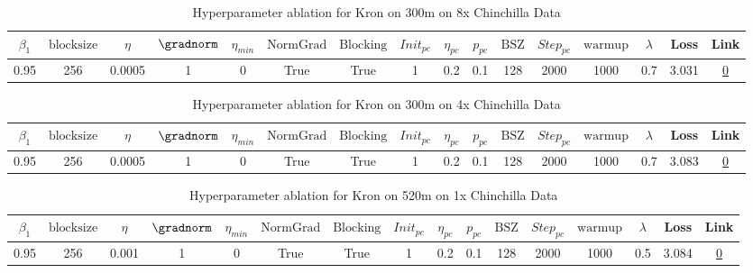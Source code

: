 \begin{table}[H]
\centering
\caption{Hyperparameter ablation for Kron on 300m on 8x Chinchilla Data}
\label{tab:ablation_kron_300m_8}
\begin{tabular}{cccccccccccccccc}
\toprule
$\beta_1$ & $\mathrm{block size}$ & $\eta$ & $\gradnorm$ & $\eta_{min}$ & $\mathrm{NormGrad}$ & $\mathrm{Blocking}$ & $Init_{pc}$ & $\eta_{pc}$ & $p_{pc}$ & $\mathrm{BSZ}$ & $Step_{pc}$ & $\mathrm{warmup}$ & $\lambda$ & Loss & Link \\
\midrule
0.95 & 256 & 0.0005 & 1 & 0 & True & True & 1 & 0.2 & 0.1 & 128 & 2000 & 1000 & 0.7 & 3.031 & \href{https://wandb.ai/stanford-mercury/optimizer-scaling/runs/sweep-300m-48B-kronabb76feelr0.0005-wd0.7-b10.95-plr0.2-pis1-gn1-0ed5c4}{0} \\
\midrule
\bottomrule
\end{tabular}
\end{table}

\begin{table}[H]
\centering
\caption{Hyperparameter ablation for Kron on 300m on 4x Chinchilla Data}
\label{tab:ablation_kron_300m_4}
\begin{tabular}{cccccccccccccccc}
\toprule
$\beta_1$ & $\mathrm{block size}$ & $\eta$ & $\gradnorm$ & $\eta_{min}$ & $\mathrm{NormGrad}$ & $\mathrm{Blocking}$ & $Init_{pc}$ & $\eta_{pc}$ & $p_{pc}$ & $\mathrm{BSZ}$ & $Step_{pc}$ & $\mathrm{warmup}$ & $\lambda$ & Loss & Link \\
\midrule
0.95 & 256 & 0.0005 & 1 & 0 & True & True & 1 & 0.2 & 0.1 & 128 & 2000 & 1000 & 0.7 & 3.083 & \href{https://wandb.ai/stanford-mercury/optimizer-scaling/runs/sweep-300m-24B-kronb55572lr0.0005-wd0.7-b10.95-plr0.2-pis1-gn1-n-9479df}{0} \\
\midrule
\bottomrule
\end{tabular}
\end{table}

\begin{table}[H]
\centering
\caption{Hyperparameter ablation for Kron on 520m on 1x Chinchilla Data}
\label{tab:ablation_kron_520m_1}
\begin{tabular}{cccccccccccccccc}
\toprule
$\beta_1$ & $\mathrm{block size}$ & $\eta$ & $\gradnorm$ & $\eta_{min}$ & $\mathrm{NormGrad}$ & $\mathrm{Blocking}$ & $Init_{pc}$ & $\eta_{pc}$ & $p_{pc}$ & $\mathrm{BSZ}$ & $Step_{pc}$ & $\mathrm{warmup}$ & $\lambda$ & Loss & Link \\
\midrule
0.95 & 256 & 0.001 & 1 & 0 & True & True & 1 & 0.2 & 0.1 & 128 & 2000 & 1000 & 0.5 & 3.084 & \href{https://wandb.ai/stanford-mercury/optimizer-scaling/runs/sweep-520m-10B-kronb99966lr0.001-wd0.5-b10.95-plr0.2-pis1-gn1-no-99dc7c}{0} \\
\midrule
\bottomrule
\end{tabular}
\end{table}

